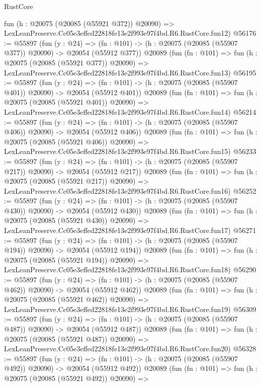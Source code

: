 \begin{lexlean}{RustCore}
\begin{coremodule}
    fun (h : @20075 (@20085 (@55921 @372)) @20090) =>
    LexLeanPreserve.Cc05e3effed22818fe13e2f993e97f4bd.R6.RustCore.fun12)
@56176 := @55897
    (fun (y : @24) =>
    (fn : @101) -> (h : @20075 (@20085 (@55907 @377)) @20090) -> @20054 (@55912 @377))
    @20089
    (fun (fn : @101) =>
    fun (h : @20075 (@20085 (@55921 @377)) @20090) =>
    LexLeanPreserve.Cc05e3effed22818fe13e2f993e97f4bd.R6.RustCore.fun13)
@56195 := @55897
    (fun (y : @24) =>
    (fn : @101) -> (h : @20075 (@20085 (@55907 @401)) @20090) -> @20054 (@55912 @401))
    @20089
    (fun (fn : @101) =>
    fun (h : @20075 (@20085 (@55921 @401)) @20090) =>
    LexLeanPreserve.Cc05e3effed22818fe13e2f993e97f4bd.R6.RustCore.fun14)
@56214 := @55897
    (fun (y : @24) =>
    (fn : @101) -> (h : @20075 (@20085 (@55907 @406)) @20090) -> @20054 (@55912 @406))
    @20089
    (fun (fn : @101) =>
    fun (h : @20075 (@20085 (@55921 @406)) @20090) =>
    LexLeanPreserve.Cc05e3effed22818fe13e2f993e97f4bd.R6.RustCore.fun15)
@56233 := @55897
    (fun (y : @24) =>
    (fn : @101) -> (h : @20075 (@20085 (@55907 @217)) @20090) -> @20054 (@55912 @217))
    @20089
    (fun (fn : @101) =>
    fun (h : @20075 (@20085 (@55921 @217)) @20090) =>
    LexLeanPreserve.Cc05e3effed22818fe13e2f993e97f4bd.R6.RustCore.fun16)
@56252 := @55897
    (fun (y : @24) =>
    (fn : @101) -> (h : @20075 (@20085 (@55907 @430)) @20090) -> @20054 (@55912 @430))
    @20089
    (fun (fn : @101) =>
    fun (h : @20075 (@20085 (@55921 @430)) @20090) =>
    LexLeanPreserve.Cc05e3effed22818fe13e2f993e97f4bd.R6.RustCore.fun17)
@56271 := @55897
    (fun (y : @24) =>
    (fn : @101) -> (h : @20075 (@20085 (@55907 @194)) @20090) -> @20054 (@55912 @194))
    @20089
    (fun (fn : @101) =>
    fun (h : @20075 (@20085 (@55921 @194)) @20090) =>
    LexLeanPreserve.Cc05e3effed22818fe13e2f993e97f4bd.R6.RustCore.fun18)
@56290 := @55897
    (fun (y : @24) =>
    (fn : @101) -> (h : @20075 (@20085 (@55907 @462)) @20090) -> @20054 (@55912 @462))
    @20089
    (fun (fn : @101) =>
    fun (h : @20075 (@20085 (@55921 @462)) @20090) =>
    LexLeanPreserve.Cc05e3effed22818fe13e2f993e97f4bd.R6.RustCore.fun19)
@56309 := @55897
    (fun (y : @24) =>
    (fn : @101) -> (h : @20075 (@20085 (@55907 @487)) @20090) -> @20054 (@55912 @487))
    @20089
    (fun (fn : @101) =>
    fun (h : @20075 (@20085 (@55921 @487)) @20090) =>
    LexLeanPreserve.Cc05e3effed22818fe13e2f993e97f4bd.R6.RustCore.fun20)
@56328 := @55897
    (fun (y : @24) =>
    (fn : @101) -> (h : @20075 (@20085 (@55907 @492)) @20090) -> @20054 (@55912 @492))
    @20089
    (fun (fn : @101) =>
    fun (h : @20075 (@20085 (@55921 @492)) @20090) =>

\end{coremodule}
\end{lexlean}
